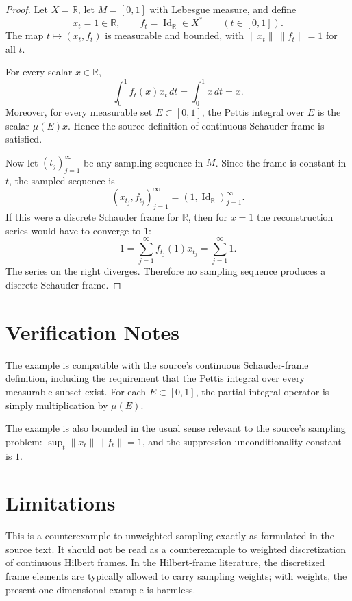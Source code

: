 \documentclass[11pt]{article}
\begin{document}
\begin{proof}
Let \(X=\mathbb R\), let \(M=[0,1]\) with Lebesgue measure, and define
\[
  x_t=1\in \mathbb R,\qquad f_t=\operatorname{Id}_{\mathbb R}\in X^*
  \qquad (t\in[0,1]).
\]
The map \(t\mapsto (x_t,f_t)\) is measurable and bounded, with
\(\|x_t\|\,\|f_t\|=1\) for all \(t\).

For every scalar \(x\in\mathbb R\),
\[
  \int_0^1 f_t(x)x_t\,dt
  =
  \int_0^1 x\,dt
  =
  x.
\]
Moreover, for every measurable set \(E\subset[0,1]\), the Pettis integral over
\(E\) is the scalar \(\mu(E)x\). Hence the source definition of continuous
Schauder frame is satisfied.

Now let \((t_j)_{j=1}^\infty\) be any sampling sequence in \(M\). Since the
frame is constant in \(t\), the sampled sequence is
\[
  (x_{t_j},f_{t_j})_{j=1}^\infty
  =
  (1,\operatorname{Id}_{\mathbb R})_{j=1}^\infty .
\]
If this were a discrete Schauder frame for \(\mathbb R\), then for \(x=1\) the
reconstruction series would have to converge to \(1\):
\[
  1
  =
  \sum_{j=1}^{\infty} f_{t_j}(1)x_{t_j}
  =
  \sum_{j=1}^{\infty} 1 .
\]
The series on the right diverges. Therefore no sampling sequence produces a
discrete Schauder frame.
\end{proof}

\section*{Verification Notes}

The example is compatible with the source's continuous Schauder-frame
definition, including the requirement that the Pettis integral over every
measurable subset exist. For each \(E\subset[0,1]\), the partial integral
operator is simply multiplication by \(\mu(E)\).

The example is also bounded in the usual sense relevant to the source's
sampling problem: \(\sup_t\|x_t\|\|f_t\|=1\), and the suppression
unconditionality constant is \(1\).

\section*{Limitations}

This is a counterexample to unweighted sampling exactly as formulated in the
source text. It should not be read as a counterexample to weighted
discretization of continuous Hilbert frames. In the Hilbert-frame literature,
the discretized frame elements are typically allowed to carry sampling weights;
with weights, the present one-dimensional example is harmless.
\end{document}
